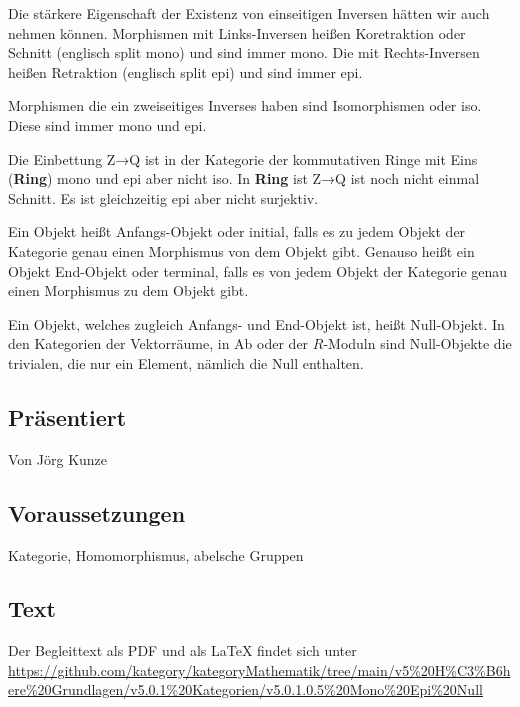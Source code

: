 \documentclass[a4paper]{amsart}
\theoremstyle{definition}
\begin{document}
Die stärkere Eigenschaft der Existenz von einseitigen Inversen hätten wir auch nehmen können. Morphismen mit Links-Inversen heißen Koretraktion oder Schnitt (englisch split mono) und sind immer mono. Die mit Rechts-Inversen heißen Retraktion (englisch split epi) und sind immer epi. 

Morphismen die ein zweiseitiges Inverses haben sind Isomorphismen oder iso. Diese sind immer mono und epi.

Die Einbettung Z→Q ist in der Kategorie der kommutativen Ringe mit Eins (\textbf{Ring}) mono und epi aber nicht iso.
In \textbf{Ring} ist Z→Q ist noch nicht einmal Schnitt. Es ist gleichzeitig epi aber nicht surjektiv.

Ein Objekt heißt Anfangs-Objekt oder initial, falls es zu jedem Objekt der Kategorie genau einen Morphismus von dem Objekt gibt. Genauso heißt ein Objekt End-Objekt oder terminal, falls es von jedem Objekt der Kategorie genau einen Morphismus zu dem Objekt gibt.

Ein Objekt, welches zugleich Anfangs- und End-Objekt ist, heißt Null-Objekt. In den Kategorien der Vektorräume, in Ab oder der $R$-Moduln sind Null-Objekte die trivialen, die nur ein Element, nämlich die Null enthalten.

\subsection*{Präsentiert}
Von Jörg Kunze

\subsection*{Voraussetzungen}
Kategorie, Homomorphismus, abelsche Gruppen

\subsection*{Text}
Der Begleittext als PDF und als LaTeX findet sich unter
{\tiny
   \url{https://github.com/kategory/kategoryMathematik/tree/main/v5%20H%C3%B6here%20Grundlagen/v5.0.1%20Kategorien/v5.0.1.0.5%20Mono%20Epi%20Null}
}
\end{document}

